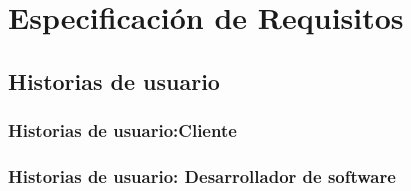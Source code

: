 \chapter{Especificación de Requisitos}

\section{Historias de usuario}
\subsection{Historias de usuario:Cliente}
\subsection{Historias de usuario: Desarrollador de software}